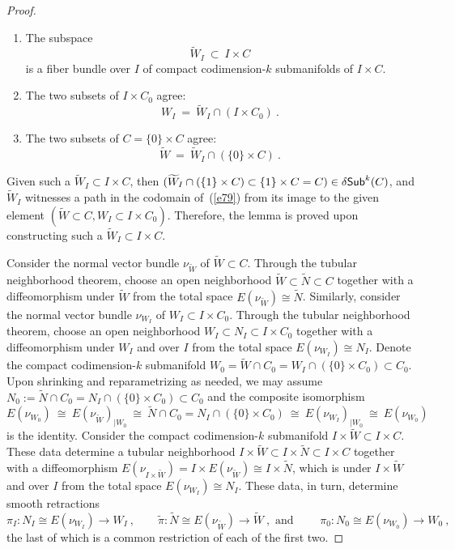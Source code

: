 \documentclass[10pt,a4paper]{amsart}
\DeclareMathOperator{\dSub}{\delta{\sf Sub}}
\newcommand{\w}{\widetilde}
\begin{document}
\begin{proof}
\begin{enumerate}
    \item The subspace
    \[
    \w{W}_I
    ~\subset~
    I \times C
    \]
    is a fiber bundle over $I$ of compact codimension-$k$ submanifolds of $I \times C$.

    
    \item The two subsets of $I \times C_0$ agree:
    \[
    W_I
    ~=~
    \w{W}_I \cap (I \times C_0) 
    ~.
    \]

    \item The two subsets of $C = \{0\} \times C$ agree:
    \[
    \w{W}
    ~=~
    \w{W}_I \cap (\{0\} \times C) 
    ~.
    \]
    
\end{enumerate}
Given such a $\w{W}_I \subset I \times C$, then $(\w{W}_I \cap (\{1\} \times C) \subset \{1\} \times C = C) \in \dSub^k(C)$, and $\w{W}_I$ witnesses a path in the codomain of~(\ref{e79}) from its image to the given element $(\w{W} \subset C , W_I \subset I \times C_0)$.
Therefore, the lemma is proved upon constructing such a $\w{W}_I \subset I \times C$.





Consider the normal vector bundle $\nu_{\w{W}}$ of $\w{W} \subset C$.
Through the tubular neighborhood theorem, choose an open neighborhood $\w{W} \subset \w{N} \subset C$ together with a diffeomorphism under $\w{W}$ from the total space $E(\nu_{\w{W}}) \cong \w{N}$.
Similarly, consider the normal vector bundle $\nu_{W_I}$ of $W_I \subset I \times C_0$.
Through the tubular neighborhood theorem, choose an open neighborhood $W_I \subset N_I \subset I \times C_0$ together with a diffeomorphism under $W_I$ and over $I$ from the total space $E(\nu_{W_I}) \cong N_I$.
Denote the compact codimension-$k$ submanifold $W_0 = \w{W} \cap C_0 = W_I \cap (\{0\} \times C_0) \subset C_0$.
Upon shrinking and reparametrizing as needed, we may assume $N_0 := \w{N} \cap C_0 = N_I \cap (\{0\} \times C_0) \subset C_0$ and the composite isomorphism 
\[
E(\nu_{W_0}) 
~\cong~
E(\nu_{\w{W}})_{|W_0}
~\cong~
\w{N} \cap C_0 = N_I \cap (\{0\} \times C_0) 
~\cong~ 
E(\nu_{W_I})_{|W_0} 
~\cong~ 
E(\nu_{W_0})
\]
is the identity.
Consider the compact codimension-$k$ submanifold $I \times \w{W} \subset I \times C$.
These data determine a tubular neighborhood $I \times \w{W} \subset I \times \w{N} \subset I \times C$ together with a diffeomorphism $E(\nu_{I\times \w{W}}) = I \times E(\nu_{\w{W}}) \cong I \times \w{N}$, which is 
under $I \times \w{W}$ and over $I$ from the total space $E(\nu_{W_I}) \cong N_I$.
These data, in turn, determine smooth retractions
\[
\pi_I
\colon 
N_I
\cong
E(\nu_{W_I})
\to
W_I
~,\qquad
\w{\pi}
\colon 
\w{N}
\cong
E(\nu_{\w{W}})
\to
\w{W}
~,\text{ and }\qquad
\pi_0
\colon 
N_0
\cong
E(\nu_{W_0})
\to
W_0
~,
\]
the last of which is a common restriction of each of the first two.








\end{proof}
\end{document}
